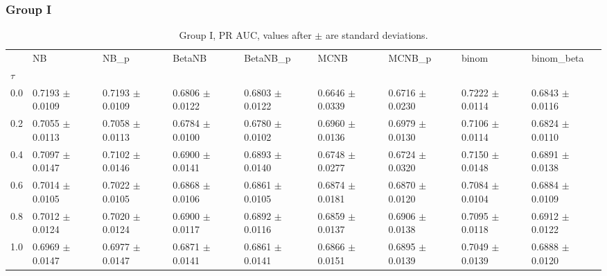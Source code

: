 \subsubsection*{Group I}
\begin{table}[H]
\centering
\begin{adjustbox}{max width=\linewidth}
\begin{tabular}{lllllllll}
\toprule
 & NB & NB\_p & BetaNB & BetaNB\_p & MCNB & MCNB\_p & binom & binom\_beta \\
$\tau$ &  &  &  &  &  &  &  &  \\
\midrule
0.0 & 0.7193 $\pm$ 0.0109 & 0.7193 $\pm$ 0.0109 & 0.6806 $\pm$ 0.0122 & 0.6803 $\pm$ 0.0122 & 0.6646 $\pm$ 0.0339 & 0.6716 $\pm$ 0.0230 & 0.7222 $\pm$ 0.0114 & 0.6843 $\pm$ 0.0116 \\
0.2 & 0.7055 $\pm$ 0.0113 & 0.7058 $\pm$ 0.0113 & 0.6784 $\pm$ 0.0100 & 0.6780 $\pm$ 0.0102 & 0.6960 $\pm$ 0.0136 & 0.6979 $\pm$ 0.0130 & 0.7106 $\pm$ 0.0114 & 0.6824 $\pm$ 0.0110 \\
0.4 & 0.7097 $\pm$ 0.0147 & 0.7102 $\pm$ 0.0146 & 0.6900 $\pm$ 0.0141 & 0.6893 $\pm$ 0.0140 & 0.6748 $\pm$ 0.0277 & 0.6724 $\pm$ 0.0320 & 0.7150 $\pm$ 0.0148 & 0.6891 $\pm$ 0.0138 \\
0.6 & 0.7014 $\pm$ 0.0105 & 0.7022 $\pm$ 0.0105 & 0.6868 $\pm$ 0.0106 & 0.6861 $\pm$ 0.0105 & 0.6874 $\pm$ 0.0181 & 0.6870 $\pm$ 0.0120 & 0.7084 $\pm$ 0.0104 & 0.6884 $\pm$ 0.0109 \\
0.8 & 0.7012 $\pm$ 0.0124 & 0.7020 $\pm$ 0.0124 & 0.6900 $\pm$ 0.0117 & 0.6892 $\pm$ 0.0116 & 0.6859 $\pm$ 0.0137 & 0.6906 $\pm$ 0.0138 & 0.7095 $\pm$ 0.0118 & 0.6912 $\pm$ 0.0122 \\
1.0 & 0.6969 $\pm$ 0.0147 & 0.6977 $\pm$ 0.0147 & 0.6871 $\pm$ 0.0141 & 0.6861 $\pm$ 0.0141 & 0.6866 $\pm$ 0.0151 & 0.6895 $\pm$ 0.0139 & 0.7049 $\pm$ 0.0139 & 0.6888 $\pm$ 0.0120 \\
\bottomrule
\end{tabular}

\end{adjustbox}
\caption{Group I, PR AUC, values after $\pm$ are standard deviations.}
\end{table}

